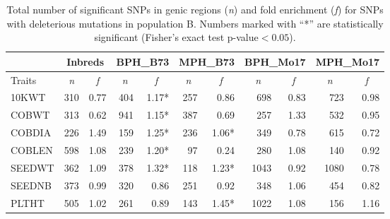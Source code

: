 \documentclass[12pt]{article}
\begin{document}
\begin{table}[ht]
  \begin{center}
    \caption[]{Total number of significant SNPs in genic regions (\emph{n}) and fold enrichment (\emph{f}) for SNPs with deleterious mutations in population B. Numbers marked with ``*'' are statistically significant (Fisher's exact test p-value$<0.05$).}
{\fontsize{10}{10}\sf
      \begin{tabular}{l|rr|rr|rr|rr|rr} 
\toprule
\multicolumn{1}{c}{}	&	\multicolumn{2}{c}{Inbreds}	&	\multicolumn{2}{c}{BPH\_B73}	&	\multicolumn{2}{c}{MPH\_B73}	&	\multicolumn{2}{c}{BPH\_Mo17}	&	\multicolumn{2}{c}{MPH\_Mo17}	\\	\hline 
Traits	& 	\multicolumn{1}{c}{\emph{n}} 	& 	\multicolumn{1}{c|}{\emph{f}} 	& 	\multicolumn{1}{c}{\emph{n}} 	& 	\multicolumn{1}{c|}{\emph{f}} 	& 	\multicolumn{1}{c}{\emph{n}} 	& 	\multicolumn{1}{c|}{\emph{f}}	& 	\multicolumn{1}{c}{\emph{n}} 	& 	\multicolumn{1}{c|}{\emph{f}} 	& 	\multicolumn{1}{c}{\emph{n}} 	& 	\multicolumn{1}{c}{\emph{f}}	\\	\hline \hline 
10KWT 	& 	310 	& 	0.77 	& 	404 	& 	1.17* 	& 	257 	& 	0.86 	& 	698 	& 	0.83 	& 	723 	& 	0.98	\\
COBWT 	& 	313 	& 	0.62 	& 	941 	& 	1.15* 	& 	387 	& 	0.69 	& 	257 	& 	1.33 	& 	532 	& 	0.95	\\
COBDIA 	& 	226 	& 	1.49 	& 	159 	& 	1.25* 	& 	236 	& 	1.06* 	& 	349 	& 	0.78 	& 	615 	& 	0.72	\\
COBLEN 	& 	598 	& 	1.08 	& 	239 	& 	1.20* 	& 	97 	& 	0.24 	& 	280 	& 	1.08 	& 	140 	& 	0.92	\\
SEEDWT 	& 	362 	& 	1.09 	& 	378 	& 	1.32* 	& 	118 	& 	1.23* 	& 	1043 	& 	0.92 	& 	1080 	& 	0.78	\\
SEEDNB 	& 	373 	& 	0.99 	& 	320 	& 	0.86 	& 	251 	& 	0.92 	& 	348 	& 	1.06 	& 	454 	& 	0.82	\\
PLTHT 	& 	505 	& 	1.02 	& 	261 	& 	0.89 	& 	143 	& 	1.45* 	& 	1022 	& 	1.08 	& 	156 	& 	1.16	\\
\bottomrule
      \end{tabular}
}
    \label{popB_sig_enrichment}  
  \end{center}
\end{table}
\end{document}
